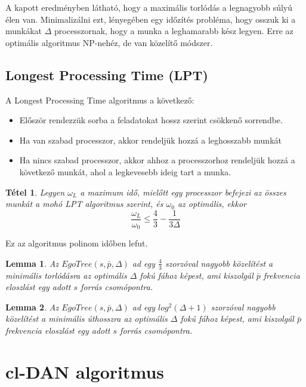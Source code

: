\documentclass[12pt]{report}
\newtheorem{mytetel}{Tétel}
\newtheorem{mylemma}{Lemma}
\begin{document}
A kapott eredményben látható, hogy a maximális torlódás a legnagyobb súlyú élen van.
Minimalizálni ezt, lényegében egy időzítés probléma, hogy osszuk ki a munkákat \(\Delta\) processzornak, hogy a munka a leghamarabb kész legyen.
Erre az optimális algoritmus NP-nehéz, de van közelítő módszer.

\subsection{Longest Processing Time (LPT)}

A Longest Processing Time algoritmus a következő:

\begin{itemize}
	\item Először rendezzük sorba a feladatokat hossz szerint csökkenő sorrendbe.
	\item Ha van szabad processzor, akkor rendeljük hozzá a leghosszabb munkát
	\item Ha nincs szabad processzor, akkor ahhoz a processzorhoz rendeljük hozzá a következő munkát, ahol a legkevesebb ideig tart a munka.
\end{itemize}

\begin{mytetel}
	Legyen \(\omega_L\) a maximum idő, mielőtt egy processzor befejezi az összes munkát a mohó LPT algoritmus szerint, és \(\omega_0\) az optimális, ekkor \[\frac{\omega_L}{\omega_0} \le \frac{4}{3} - \frac{1}{3\Delta}\]
\end{mytetel}

Ez az algoritmus polinom időben lefut.

\begin{mylemma}
	Az \(EgoTree(s, \bar{p}, \Delta)\) ad egy \(\frac{4}{3}\) szorzóval nagyobb közelítést a minimális torlódásra az optimális \(\Delta\) fokú fához képest, ami kiszolgál \(\bar{p}\) frekvencia eloszlást egy adott \(s\) forrás csomópontra.
\end{mylemma}

\begin{mylemma}
	Az \(EgoTree(s, \bar{p}, \Delta)\) ad egy \(log^2(\Delta + 1)\) szorzóval nagyobb közelítést a minimális úthosszra az optimális \(\Delta\) fokú fához képest, ami kiszolgál \(\bar{p}\) frekvencia eloszlást egy adott \(s\) forrás csomópontra.
\end{mylemma}

\section{cl-DAN algoritmus}
\end{document}
